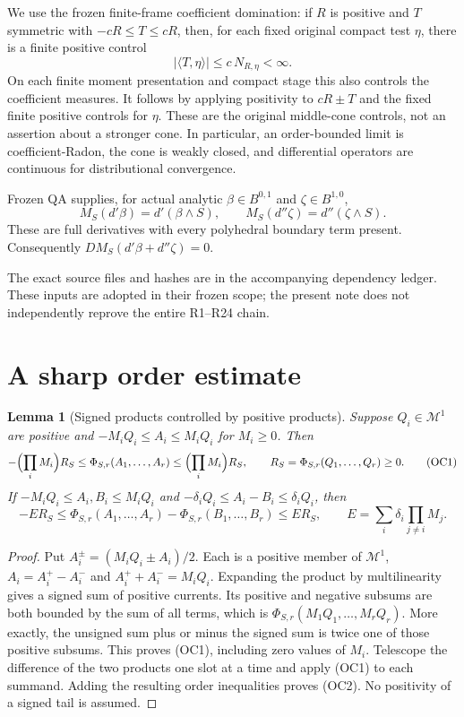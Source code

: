 \documentclass[11pt]{article}
\newtheorem{lemma}[theorem]{Lemma}
\theoremstyle{remark}\newtheorem{remark}[theorem]{Remark}
\newcommand{\M}{\mathcal M^1}
\begin{document}
We use the frozen finite-frame coefficient domination: if $R$ is positive
and $T$ symmetric with $-cR\le T\le cR$, then, for each fixed original
compact test $\eta$, there is a finite positive control
\[
 |\langle T,\eta\rangle|\le c\,N_{R,\eta}<\infty.       \tag{I2}
\]
On each finite moment presentation and compact stage this also controls
the coefficient measures. It follows by applying positivity to $cR\pm T$
and the fixed finite positive controls for $\eta$. These are the original
middle-cone controls, not an assertion about a stronger cone. In particular,
an order-bounded limit is coefficient-Radon, the cone is weakly closed,
and differential operators are continuous for distributional convergence.

Frozen QA supplies, for actual analytic $\beta\in B^{0,1}$ and
$\zeta\in B^{1,0}$,
\[
 M_S(d'\beta)=d'(\beta\wedge S),\qquad
 M_S(d''\zeta)=d''(\zeta\wedge S).                       \tag{I3}
\]
These are full derivatives with every polyhedral boundary term present.
Consequently $DM_S(d'\beta+d''\zeta)=0$.

The exact source files and hashes are in the accompanying dependency ledger.
These inputs are adopted in their frozen scope; the present note does not
independently reprove the entire R1--R24 chain.

\section{A sharp order estimate}

\begin{lemma}[Signed products controlled by positive products]\label{lem:order}
Suppose $Q_i\in\M$ are positive and
$-M_iQ_i\le A_i\le M_iQ_i$ for $M_i\ge0$. Then
\[
 -\Bigl(\prod_iM_i\Bigr)R_S\le
 \Phi_{S,r}(A_1,\ldots,A_r)\le
 \Bigl(\prod_iM_i\Bigr)R_S,
 \qquad R_S=\Phi_{S,r}(Q_1,\ldots,Q_r)\ge0.             \tag{OC1}
\]
If $-M_iQ_i\le A_i,B_i\le M_iQ_i$ and
$-\delta_iQ_i\le A_i-B_i\le\delta_iQ_i$, then
\[
 -E R_S\le \Phi_{S,r}(A_1,\ldots,A_r)
               -\Phi_{S,r}(B_1,\ldots,B_r)\le E R_S,
 \qquad E=\sum_i\delta_i\prod_{j\ne i}M_j.             \tag{OC2}
\]
\end{lemma}
\begin{proof}
Put $A_i^\pm=(M_iQ_i\pm A_i)/2$. Each is a positive member of $\M$,
$A_i=A_i^+-A_i^-$ and $A_i^++A_i^-=M_iQ_i$. Expanding the product by
multilinearity gives a signed sum of positive currents. Its positive and
negative subsums are both bounded by the sum of all terms, which is
$\Phi_{S,r}(M_1Q_1,\ldots,M_rQ_r)$. More exactly, the unsigned sum
plus or minus the signed sum is twice one of those positive subsums.
This proves (OC1), including zero values of $M_i$. Telescope the difference
of the two products one slot at a time and apply (OC1) to each summand.
Adding the resulting order inequalities proves (OC2). No positivity of
a signed tail is assumed.
\end{proof}
\end{document}
